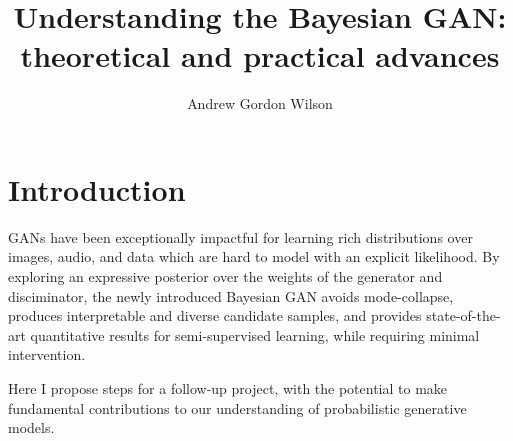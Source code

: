 \documentclass[11pt]{article}
\title{Understanding the Bayesian GAN: \\theoretical and practical advances}
\author{Andrew Gordon Wilson}
\begin{document}
\maketitle

\section{Introduction}

GANs have been exceptionally impactful for learning rich distributions over images, audio, and data which are hard to model with an explicit likelihood.  By exploring an expressive posterior over the weights of the generator and disciminator, the newly introduced Bayesian GAN \citep{saatchiwilson2017} avoids mode-collapse, produces interpretable and diverse candidate samples, and provides state-of-the-art quantitative results for semi-supervised learning, while requiring minimal intervention. 

Here I propose steps for a follow-up project, with the potential to make fundamental contributions to our understanding of probabilistic generative models.
\end{document}
